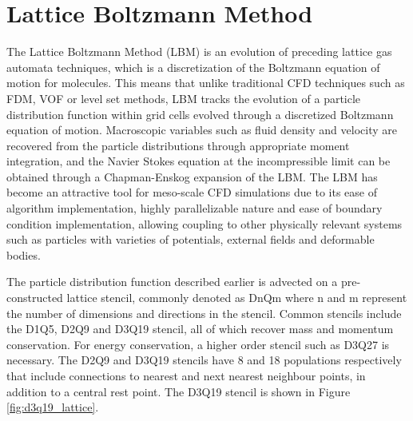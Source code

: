 \section{Lattice Boltzmann Method}

The Lattice Boltzmann Method (LBM) is an evolution of preceding lattice gas automata techniques, which is a discretization of the Boltzmann equation of motion for 
molecules. This means that unlike traditional CFD techniques such as FDM, VOF or level set methods, LBM tracks the evolution of a 
particle distribution function within grid cells evolved through a discretized Boltzmann equation of motion. Macroscopic variables such as fluid density and 
velocity are recovered from the particle distributions through appropriate moment integration, and the Navier Stokes equation at the incompressible limit can be 
obtained through a Chapman-Enskog expansion of the LBM. The LBM has become an attractive tool for meso-scale CFD simulations due to its ease of algorithm 
implementation, highly parallelizable nature and ease of boundary condition implementation, allowing coupling to other physically relevant systems such as 
particles with varieties of potentials, external fields and deformable bodies.

The particle distribution function described earlier is advected on a pre-constructed lattice stencil, commonly denoted as DnQm where n and m represent the 
number of dimensions and directions in the stencil. Common stencils include the D1Q5, D2Q9 and D3Q19 stencil, all of which recover mass and momentum conservation. 
For energy conservation, a higher order stencil such as D3Q27 is necessary. The D2Q9 and D3Q19 stencils have 8 and 18 populations respectively that include 
connections to nearest and next nearest neighbour points, in addition to a central rest point. The D3Q19 stencil is shown in Figure \ref{fig:d3q19_lattice}.

